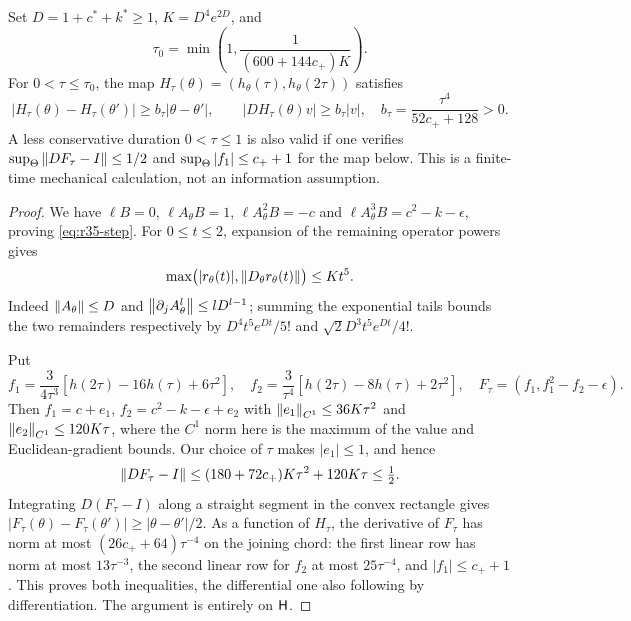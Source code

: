 \begin{lemma}\label{lem:r35-embedding}
Set $D=1+c^*+k^*\ge1$, $K=D^4e^{2D}$, and
\[
 \tau_0=\min\left(1,\frac1{(600+144c_+)K}\right).
\]
For $0<\tau\le\tau_0$, the map
$H_\tau(\theta)=(h_\theta(\tau),h_\theta(2\tau))$ satisfies
\[
 |H_\tau(\theta)-H_\tau(\theta')|\ge b_\tau|\theta-\theta'|,
 \qquad |DH_\tau(\theta)v|\ge b_\tau|v|,
 \quad b_\tau=\frac{\tau^4}{52c_++128}>0.
\]
A less conservative duration $0<\tau\le1$ is also valid if one verifies $\sup_\Theta\left\|DF_\tau-I\right\|\le1/2$ and $\sup_\Theta|f_1|\le c_++1$ for the map below. This is a finite-time mechanical calculation, not an information assumption.
\end{lemma}
\begin{proof}
We have $\ell B=0$, $\ell A_\theta B=1$, $\ell A_\theta^2B=-c$ and $\ell A_\theta^3B=c^2-k-\epsilon$, proving \eqref{eq:r35-step}. For $0\le t\le2$, expansion of the remaining operator powers gives
\[
 \max\bigl(|r_\theta(t)|,\left\|D_\theta r_\theta(t)\right\|\bigr)\le Kt^5.
\]
Indeed $\left\|A_\theta\right\|\le D$ and
$\left\|\partial_j A_\theta^l\right\|\le lD^{l-1}$; summing the exponential tails bounds the two remainders respectively by $D^4t^5e^{Dt}/5!$ and $\sqrt2D^3t^5e^{Dt}/4!$.

Put
\[
 f_1=\frac3{4\tau^3}[h(2\tau)-16h(\tau)+6\tau^2],\quad
 f_2=\frac3{\tau^4}[h(2\tau)-8h(\tau)+2\tau^2],\quad
 F_\tau=(f_1,f_1^2-f_2-\epsilon).
\]
Then $f_1=c+e_1$, $f_2=c^2-k-\epsilon+e_2$ with
$\left\|e_1\right\|_{C^1}\le36K\tau^2$ and $\left\|e_2\right\|_{C^1}\le120K\tau$,
where the $C^1$ norm here is the maximum of the value and Euclidean-gradient bounds. Our choice of $\tau$ makes $|e_1|\le1$, and hence
\[
 \left\|DF_\tau-I\right\|
 \le(180+72c_+)K\tau^2+120K\tau\le\tfrac12.
\]
Integrating $D(F_\tau-I)$ along a straight segment in the convex rectangle gives
$|F_\tau(\theta)-F_\tau(\theta')|\ge|\theta-\theta'|/2$.
As a function of $H_\tau$, the derivative of $F_\tau$ has norm at most
$(26c_++64)\tau^{-4}$ on the joining chord: the first linear row has norm at most $13\tau^{-3}$, the second linear row for $f_2$ at most $25\tau^{-4}$, and $|f_1|\le c_++1$. This proves both inequalities, the differential one also following by differentiation. The argument is entirely on $\mathsf H$.
\end{proof}

